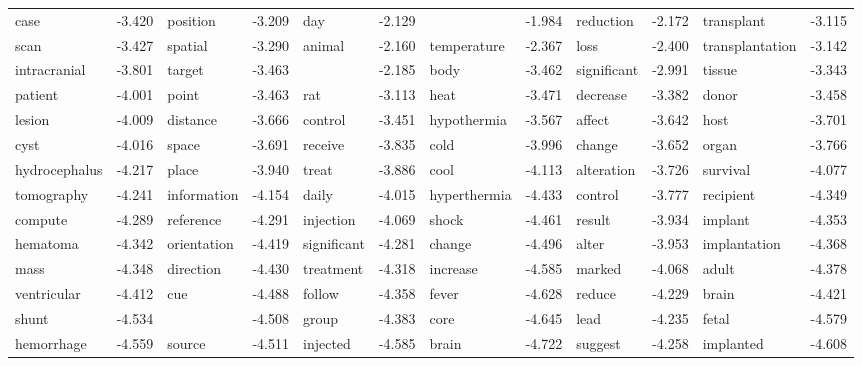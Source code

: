 \documentclass{article}
\begin{document}
\begin{table}
{\begin{tabular}{|l r|l r|l r|l r|l r|l r|}
case & -3.420 & position & -3.209 & day & -2.129 &  & -1.984 & reduction & -2.172 & transplant & -3.115\\
scan & -3.427 & spatial & -3.290 & animal & -2.160 & temperature & -2.367 & loss & -2.400 & transplantation & -3.142\\
intracranial & -3.801 & target & -3.463 &  & -2.185 & body & -3.462 & significant & -2.991 & tissue & -3.343\\
patient & -4.001 & point & -3.463 & rat & -3.113 & heat & -3.471 & decrease & -3.382 & donor & -3.458\\
lesion & -4.009 & distance & -3.666 & control & -3.451 & hypothermia & -3.567 & affect & -3.642 & host & -3.701\\
cyst & -4.016 & space & -3.691 & receive & -3.835 & cold & -3.996 & change & -3.652 & organ & -3.766\\
hydrocephalus & -4.217 & place & -3.940 & treat & -3.886 & cool & -4.113 & alteration & -3.726 & survival & -4.077\\
tomography & -4.241 & information & -4.154 & daily & -4.015 & hyperthermia & -4.433 & control & -3.777 & recipient & -4.349\\
compute & -4.289 & reference & -4.291 & injection & -4.069 & shock & -4.461 & result & -3.934 & implant & -4.353\\
hematoma & -4.342 & orientation & -4.419 & significant & -4.281 & change & -4.496 & alter & -3.953 & implantation & -4.368\\
mass & -4.348 & direction & -4.430 & treatment & -4.318 & increase & -4.585 & marked & -4.068 & adult & -4.378\\
ventricular & -4.412 & cue & -4.488 & follow & -4.358 & fever & -4.628 & reduce & -4.229 & brain & -4.421\\
shunt & -4.534 &  & -4.508 & group & -4.383 & core & -4.645 & lead & -4.235 & fetal & -4.579\\
hemorrhage & -4.559 & source & -4.511 & injected & -4.585 & brain & -4.722 & suggest & -4.258 & implanted & -4.608\\
\hline
\end{tabular}
}
\end{table}
\end{document}
